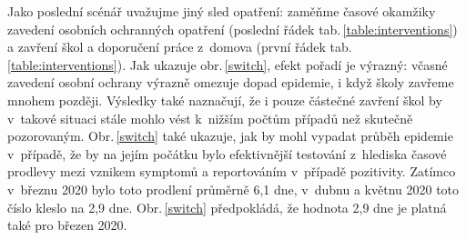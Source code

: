 Jako poslední scénář uvažujme jiný sled opatření: zaměňme časové okamžiky zavedení osobních ochranných opatření (poslední řádek tab.\,\ref{table:interventions}) a zavření škol a doporučení práce z~domova (první řádek tab.\,\ref{table:interventions}). Jak ukazuje obr.\,\ref{switch}, efekt pořadí je výrazný: včasné zavedení osobní ochrany výrazně omezuje dopad epidemie, i když školy zavřeme mnohem později. Výsledky také naznačují, že i pouze částečné zavření škol by v~takové situaci stále mohlo vést k~nižším počtům případů než skutečně pozorovaným. Obr.\,\ref{switch} také ukazuje, jak by mohl vypadat průběh epidemie v~případě, že by na jejím počátku bylo efektivnější testování z~hlediska časové prodlevy mezi vznikem symptomů a reportováním v~případě pozitivity. Zatímco v~březnu 2020 bylo toto prodlení průměrně 6,1 dne, v~dubnu a květnu 2020 toto číslo kleslo na 2,9 dne. Obr.\,\ref{switch} předpokládá, že hodnota 2,9 dne je platná také pro březen 2020.

